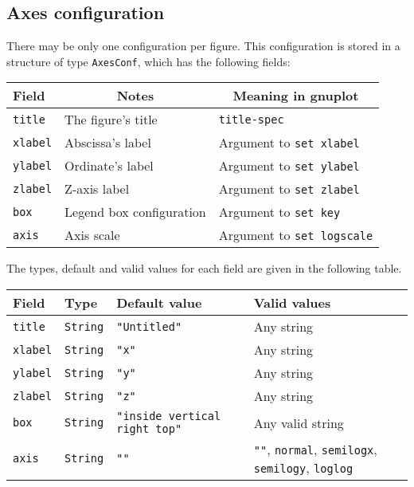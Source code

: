 \documentclass[11pt]{article}
\newcommand{\cmd}[1]{\texttt{#1}}
\begin{document}
\subsection{Axes configuration}

There may be only one configuration per figure. This configuration is stored in
a structure of type \cmd{AxesConf}, which has the following fields:

{\small
\begin{center}
\begin{tabular}{lll}
	\toprule
	\textbf{Field} & \multicolumn{1}{c}{\textbf{Notes}} &
	\multicolumn{1}{c}{\textbf{Meaning in gnuplot}} \\
	\midrule
	\cmd{title} & The figure's title & \cmd{title-spec} \\
	\cmd{xlabel} & Abscissa's label & Argument to \cmd{set xlabel} \\
	\cmd{ylabel} & Ordinate's label & Argument to \cmd{set ylabel} \\
	\cmd{zlabel} & Z-axis label & Argument to \cmd{set zlabel} \\
	\cmd{box} & Legend box configuration & Argument to \cmd{set key} \\
	\cmd{axis} & Axis scale & Argument to \cmd{set logscale} \\
	\bottomrule
\end{tabular}
\end{center}}

The types, default and valid values for each field are given in the following
table.

{\small
\begin{center}
	\begin{tabular}{lp{1.5cm}p{2cm}p{7.5cm}}
	\toprule
	\textbf{Field} & \textbf{Type} & \textbf{Default value} & \textbf{Valid values} \\
	\midrule
	\cmd{title} & \cmd{String} & \cmd{"Untitled"} & Any string \\
	\cmd{xlabel} & \cmd{String} & \cmd{"x"} & Any string \\
	\cmd{ylabel} & \cmd{String} & \cmd{"y"} & Any string \\
	\cmd{zlabel} & \cmd{String} & \cmd{"z"} & Any string \\
	\cmd{box} & \cmd{String} & \cmd{"inside vertical right top"} & Any valid
	string \\
	\cmd{axis} & \cmd{String} & \cmd{""} & \cmd{""}, \cmd{normal},
	\cmd{semilogx}, \cmd{semilogy}, \cmd{loglog}  \\
	\bottomrule
\end{tabular}
\end{center}}
\end{document}
